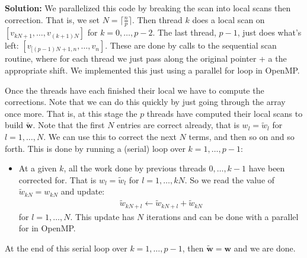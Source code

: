 \documentclass[10pt]{article}
\newcommand{\vb}[1]{\mathbf{#1}}
\newcommand{\wt}{\widetilde}
\begin{document}
\begin{enumerate}
\textbf{Solution:} We parallelized this code by breaking the scan into local scans then correction. That is, we set $N = \lceil \frac{n}{p} \rceil$.  Then thread $k$ does a local scan on $[v_{kN+1}, \dotsc, v_{(k+1)N}]$ for $k=0, \dotsc, p-2$. The last thread, $p-1$, just does what's left: $[v_{[(p-1)N + 1,n}, \dotsc, v_{n}]$. These are done by calls to the sequential scan routine, where for each thread we just pass along the original pointer + a the appropriate shift. We implemented this just using a parallel for loop in OpenMP.

Once the threads have each finished their local we have to compute the corrections. Note that we can do this quickly by just going through the array once more. That is, at this stage the $p$ threads have computed their local scans to build $\wt{\vb w}$. Note that the first $N$ entries are correct already, that is $w_{l} = \wt{w}_{l}$ for $l=1, \dotsc, N$. We can use this to correct the next $N$ terms, and then so on and so forth. This is done by running a (serial) loop over $k=1, \dotsc,  p-1$:
\begin{itemize}
	\item At a given $k$, all the work done by previous threads $0, \dotsc, k-1$ have been corrected for. That is $w_{l} = \wt w_{l}$ for $l=1, \dotsc, kN$. So we read the value of $\tilde{w}_{kN} = w_{kN}$ and update:
	\begin{align*}
	\wt w_{kN+l} \leftarrow \wt w_{kN + l} + \wt w_{kN}
	\end{align*}
	for $l=1, \dotsc,  N$. This update has $N$ iterations and can be done with a parallel for in OpenMP.
\end{itemize}
At the end of this serial loop over $k=1, \dotsc, p-1$, then $\wt{\vb{w}} = \vb{w}$ and we are done.


\end{enumerate}
\end{document}
